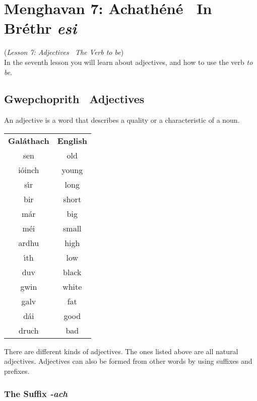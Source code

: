 \section{Menghavan 7: Achath\'{e}n\'{e} \textemdash\ In Br\'{e}thr \textit{esi}}
(\textit{Lesson 7: Adjectives \textemdash\ The Verb \textit{to be}})\\

In the seventh lesson you will learn about adjectives, and how to use the verb \textit{to be}.

\subsection{Gwepchoprith \textendash\ Adjectives}

An adjective is a word that describes a quality or a characteristic of a noun.
\begin{table}[H]
\centering
\begin{tabular}{cc}
  \toprule
  \textbf{Gal\'{a}thach} & \textbf{English}\\
  \cmidrule(lr){1-1}\cmidrule(lr){2-2}
  sen & old\\
  i\'{o}inch & young\\
  s\'{\i}r & long\\
  bir & short\\
  m\'{a}r & big\\
  m\'{e}i & small\\
  ardhu & high\\
  \'{\i}th & low\\
  duv & black\\
  gwin & white\\
  galv & fat\\
  d\'{a}i & good\\
  druch & bad\\
  \bottomrule
\end{tabular}
\label{examples_adjective}
\end{table}

There are different kinds of adjectives. The ones listed above are all natural adjectives. Adjectives can also be formed from other words by using suffixes and prefixes.

\subsubsection{The Suffix \textit{-ach}}

